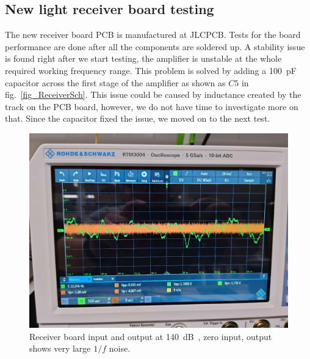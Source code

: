 \subsection{New light receiver board testing}

The new receiver board PCB is manufactured at JLCPCB.  Tests for the board performance are done after all the components are soldered up.  A stability issue is found right after we start testing, the amplifier is unstable at the whole required working frequency range.   This problem is solved by adding a \qty{100}{pF} capacitor across the first stage of the amplifier as shown as $C5$ in fig.~\ref{fig_ReceiverSch}.  This issue could be caused by inductance created by the track on the PCB board, however, we do not have time to investigate more on that.  Since the capacitor fixed the issue, we moved on to the next test.

\begin{figure}[h]
\centerline{\includegraphics[width=1\linewidth]{4-ANC_Sys/LargeNoiseRecBoard.jpg}}
\caption{Receiver board input and output at \qty{140}{dB\Omega}, zero input, output shows very large $1/f$ noise.}
\label{fig_ReceiverBoardLargeNoise}
\end{figure}


